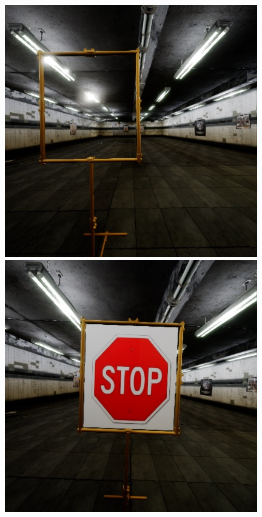 \begin{figure}[hbtp]
	\centering
	\begin{minipage}{0.3\textwidth}
		\includegraphics[width=\textwidth]{fig/gate}
	\end{minipage}
	\begin{minipage}{0.3\textwidth}
		\includegraphics[width=\textwidth]{fig/sign}

\end{minipage}
\end{figure}
